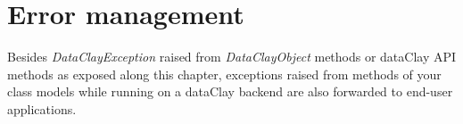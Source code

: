 %
%
%
%
%
%
% 
%

\section {Error management}
\label{sec:JavaErrorHandling}

Besides \textit{DataClayException} raised from \textit{DataClayObject} methods or dataClay API methods as exposed along this chapter, exceptions raised from methods of your class models while running on a dataClay backend are also forwarded to end-user applications.

